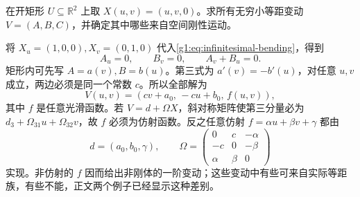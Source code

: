 \begin{exercise}\label{g1:ex:plane-infinitesimal-solutions}
	在开矩形 \(U\subseteq\mathbb R^2\) 上取 \(X(u,v)=(u,v,0)\)。求所有无穷小等距变动 \(V=(A,B,C)\)，并确定其中哪些来自空间刚性运动。
\end{exercise}
\begin{solution}
	将 \(X_u=(1,0,0),X_v=(0,1,0)\) 代入\eqref{g1:eq:infinitesimal-bending}，得到
	\[
		A_u=0,\qquad B_v=0,\qquad A_v+B_u=0.
	\]
	矩形内可先写 \(A=a(v),B=b(u)\)。第三式为 \(a'(v)=-b'(u)\)，对任意 \(u,v\) 成立，两边必须是同一个常数 \(c\)。所以全部解为
	\[
		V(u,v)=(cv+a_0,\,-cu+b_0,\,f(u,v)),
	\]
	其中 \(f\) 是任意光滑函数。若 \(V=d+\Omega X\)，斜对称矩阵使第三分量必为 \(d_3+\Omega_{31}u+\Omega_{32}v\)，故 \(f\) 必须为仿射函数。反之任意仿射 \(f=\alpha u+\beta v+\gamma\) 都由
	\[
		d=(a_0,b_0,\gamma),\qquad
		\Omega=\begin{pmatrix}0&c&-\alpha\\-c&0&-\beta\\\alpha&\beta&0\end{pmatrix}
	\]
	实现。非仿射的 \(f\) 因而给出非刚体的一阶变动；这些变动中有些可来自实际等距族，有些不能，正文两个例子已经显示这种差别。
\end{solution}
